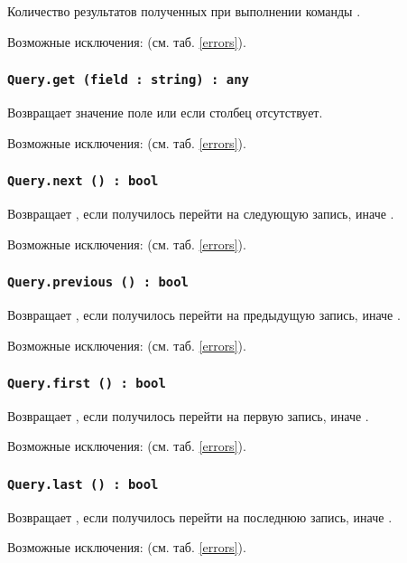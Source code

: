 Количество результатов полученных при выполнении команды .

Возможные исключения:  (см. таб. \ref{errors}).

\subsubsection{\lstinline|Query.get (field : string) : any|}

Возвращает значение поле или \void{} если столбец  отсутствует.

Возможные исключения:  (см. таб. \ref{errors}).

\subsubsection{\lstinline|Query.next () : bool|}

Возвращает \true, если получилось перейти на следующую запись, иначе \false.

Возможные исключения:  (см. таб. \ref{errors}).

\subsubsection{\lstinline|Query.previous () : bool|}

Возвращает \true, если получилось перейти на предыдущую запись, иначе \false.

Возможные исключения:  (см. таб. \ref{errors}).

\subsubsection{\lstinline|Query.first () : bool|}

Возвращает \true, если получилось перейти на первую запись, иначе \false.

Возможные исключения:  (см. таб. \ref{errors}).

\subsubsection{\lstinline|Query.last () : bool|}

Возвращает \true, если получилось перейти на последнюю запись, иначе \false.

Возможные исключения:  (см. таб. \ref{errors}).

